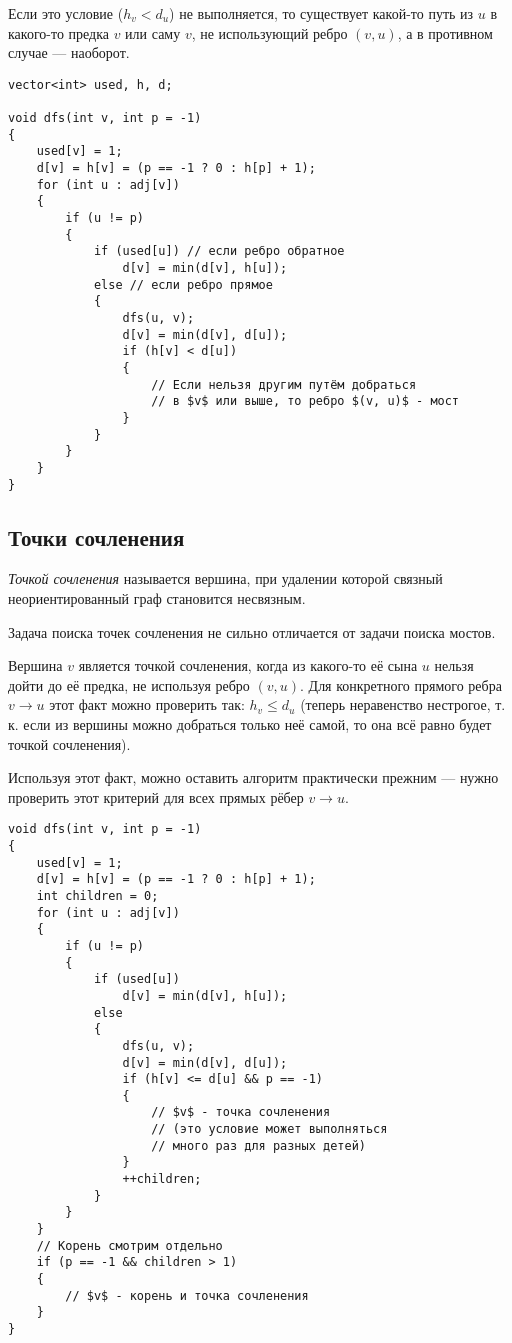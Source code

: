 Если это условие ($h_v < d_u$) не выполняется, то существует какой-то путь из $u$ в какого-то предка $v$ или саму $v$, не использующий ребро $(v, u)$, а в противном случае --- наоборот.

\begin{verbatim}
vector<int> used, h, d;

void dfs(int v, int p = -1)
{
    used[v] = 1;
    d[v] = h[v] = (p == -1 ? 0 : h[p] + 1);
    for (int u : adj[v])
    {
        if (u != p)
        {
            if (used[u]) // если ребро обратное
                d[v] = min(d[v], h[u]);
            else // если ребро прямое
            {
                dfs(u, v);
                d[v] = min(d[v], d[u]);
                if (h[v] < d[u])
                {
                    // Если нельзя другим путём добраться
                    // в $v$ или выше, то ребро $(v, u)$ - мост
                }
            }
        }
    }
}
\end{verbatim}

\subsection{Точки сочленения}

\begin{definition}
    \textit{Точкой сочленения} называется вершина, при удалении которой связный неориентированный граф становится несвязным.
\end{definition}

Задача поиска точек сочленения не сильно отличается от задачи поиска мостов.

Вершина $v$ является точкой сочленения, когда из какого-то её сына $u$ нельзя дойти до её предка, не используя ребро $(v, u)$. Для конкретного прямого ребра $v \to u$ этот факт можно проверить так: $h_v \leqslant d_u$ (теперь неравенство нестрогое, т.\,к. если из вершины можно добраться только неё самой, то она всё равно будет точкой сочленения).

Используя этот факт, можно оставить алгоритм практически прежним --- нужно проверить этот критерий для всех прямых рёбер $v \to u$.

\begin{verbatim}
void dfs(int v, int p = -1)
{
    used[v] = 1;
    d[v] = h[v] = (p == -1 ? 0 : h[p] + 1);
    int children = 0;
    for (int u : adj[v])
    {
        if (u != p)
        {
            if (used[u])
                d[v] = min(d[v], h[u]);
            else
            {
                dfs(u, v);
                d[v] = min(d[v], d[u]);
                if (h[v] <= d[u] && p == -1)
                {
                    // $v$ - точка сочленения
                    // (это условие может выполняться
                    // много раз для разных детей)
                }
                ++children;
            }
        }
    }
    // Корень смотрим отдельно
    if (p == -1 && children > 1)
    {
        // $v$ - корень и точка сочленения
    }
}
\end{verbatim}

